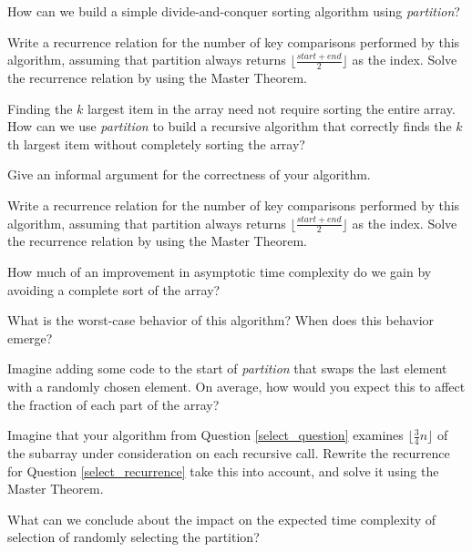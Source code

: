\documentclass{tufte-handout}
\begin{document}
\begin{questions}
How can we build a simple divide-and-conquer sorting algorithm using \emph{partition}? 

\item Write a recurrence relation for the number of key comparisons performed by this algorithm, assuming that partition always returns $\lfloor \frac{start + end}{2} \rfloor$ as the index. Solve the recurrence relation by using the Master Theorem. 

\item Finding the $k$ largest item in the array need not require sorting the entire array. How can we use \emph{partition} to build a recursive algorithm that correctly finds the $k$th largest item without completely sorting the array? \label{select_question}

\item Give an informal argument for the correctness of your algorithm.

\item Write a recurrence relation for the number of key comparisons performed by this algorithm, assuming that partition always returns $\lfloor \frac{start + end}{2} \rfloor$ as the index. Solve the recurrence relation by using the Master Theorem. \label{select_recurrence}

\item How much of an improvement in asymptotic time complexity do we gain by avoiding a complete sort of the array?

\item What is the worst-case behavior of this algorithm? When does this behavior emerge?

\item Imagine adding some code to the start of \emph{partition} that swaps the last element with a randomly chosen element. On average, how would you expect this to affect the fraction of each part of the array?

\item Imagine that your algorithm from Question \ref{select_question} examines $\lfloor \frac{3}{4} n \rfloor$ of the subarray under consideration on each recursive call. Rewrite the recurrence for Question \ref{select_recurrence} take this into account, and solve it using the Master Theorem.

\item What can we conclude about the impact on the expected time complexity of selection of randomly selecting the partition?


\end{questions}
\end{document}

